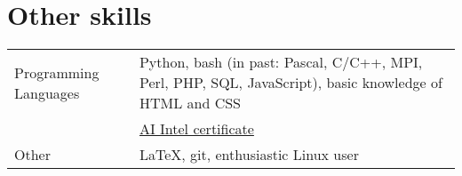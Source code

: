 \documentclass[a4paper, oneside, final]{scrartcl} %
\newcommand{\gray}{\rowcolor[gray]{.90}} %
\begin{document}
\section{Other skills}
\begin{tabularx}{0.97\linewidth}{>{\raggedleft}p{2.5cm}X}
  \gray  Programming Languages &  Python, bash (in past: Pascal, C/C++, MPI, Perl, PHP, SQL, JavaScript),
   basic knowledge of HTML and CSS\\
   & \href{http://www.cs.cas.cz/~petra/cv/cert/certificate_intel.pdf}{AI Intel certificate}\\
  Other & LaTeX, git, enthusiastic Linux user \\
\end{tabularx}


\end{document}
